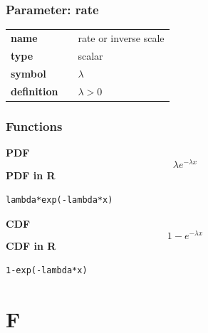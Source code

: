 \subsubsection*{Parameter: rate}

\noindent\begin{tabular}{p{2cm}cl}
\textbf{name} & & rate or inverse scale \\
\textbf{type} & & scalar \\
\textbf{symbol} & & $\lambda$  \\
\textbf{definition} & & $\lambda > 0$
\end{tabular}
\subsubsection*{Functions}

\smallskip \noindent \hspace{.2cm} \textbf{PDF} 
\begin{equation*}\lambda e^{-\lambda x}\end{equation*}
\smallskip \noindent \hspace{.2cm} \textbf{PDF in R} 
\begin{verbatim}lambda*exp(-lambda*x)\end{verbatim}
\smallskip \noindent \hspace{.2cm} \textbf{CDF} 
\begin{equation*}1 - e^{-\lambda x}\end{equation*}
\smallskip \noindent \hspace{.2cm} \textbf{CDF in R} 
\begin{verbatim}1-exp(-lambda*x)\end{verbatim}

\smallskip\section*{F} 

  \bigskip 

